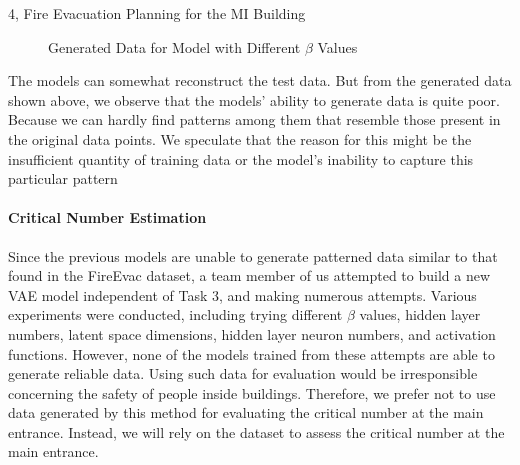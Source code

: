\begin{task}{4, Fire Evacuation Planning for the MI Building}
\begin{figure}[ht]
\hfill
{}
\hfill
{}
\caption{Generated Data for Model with Different \(\beta\) Values}
\label{fig:generate_normal_beta}
\end{figure}

The models can somewhat reconstruct the test data. But from the generated data shown above, we observe that the models' ability to generate data is quite poor. Because we can hardly find patterns among them that resemble those present in the original data points. We speculate that the reason for this might be the insufficient quantity of training data or the model's inability to capture this particular pattern

\paragraph{Critical Number Estimation}
Since the previous models are unable to generate patterned data similar to that found in the FireEvac dataset, a team member of us attempted to build a new VAE model independent of Task 3, and making numerous attempts. Various experiments were conducted, including trying different \(\beta\) values, hidden layer numbers, latent space dimensions, hidden layer neuron numbers, and activation functions. However, none of the models trained from these attempts are able to generate reliable data. Using such data for evaluation would be irresponsible concerning the safety of people inside buildings. Therefore, we prefer not to use data generated by this method for evaluating the critical number at the main entrance. Instead, we will rely on the dataset to assess the critical number at the main entrance.


\end{task}
